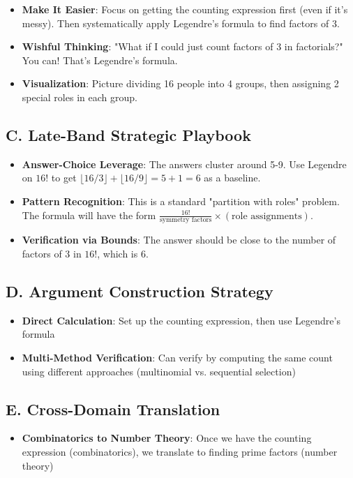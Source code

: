\documentclass[12pt]{article}
\begin{document}
\begin{strategicbox}
\begin{itemize}[leftmargin=*]
    \item \textbf{Make It Easier}: Focus on getting the counting expression first (even if it's messy). Then systematically apply Legendre's formula to find factors of 3.
    
    \item \textbf{Wishful Thinking}: "What if I could just count factors of 3 in factorials?" You can! That's Legendre's formula.
    
    \item \textbf{Visualization}: Picture dividing 16 people into 4 groups, then assigning 2 special roles in each group.
\end{itemize}

\subsection*{C. Late-Band Strategic Playbook}
\begin{itemize}[leftmargin=*]
    \item \textbf{Answer-Choice Leverage}: The answers cluster around 5-9. Use Legendre on $16!$ to get $\lfloor 16/3 \rfloor + \lfloor 16/9 \rfloor = 5 + 1 = 6$ as a baseline.
    
    \item \textbf{Pattern Recognition}: This is a standard "partition with roles" problem. The formula will have the form $\frac{16!}{\text{symmetry factors}} \times (\text{role assignments})$.
    
    \item \textbf{Verification via Bounds}: The answer should be close to the number of factors of 3 in $16!$, which is 6.
\end{itemize}

\subsection*{D. Argument Construction Strategy}
\begin{itemize}[leftmargin=*]
    \item \textbf{Direct Calculation}: Set up the counting expression, then use Legendre's formula
    
    \item \textbf{Multi-Method Verification}: Can verify by computing the same count using different approaches (multinomial vs. sequential selection)
\end{itemize}

\subsection*{E. Cross-Domain Translation}
\begin{itemize}[leftmargin=*]
    \item \textbf{Combinatorics to Number Theory}: Once we have the counting expression (combinatorics), we translate to finding prime factors (number theory)
    

\end{itemize}
\end{strategicbox}
\end{document}

